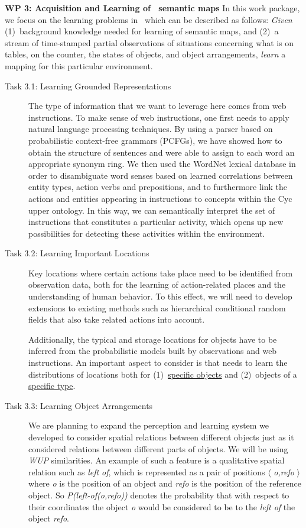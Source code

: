 \textbf{WP 3: Acquisition and Learning of \ksem\ semantic maps}
In this work package, we focus on the learning problems in 
\ksem\ which can be described as follows: \emph{Given} (1)~background
knowledge needed for learning of semantic maps,  and (2)~a stream
of time-stamped partial observations of situations concerning what is
on tables, on the counter, the states of objects, and object
arrangements, \emph{learn} a mapping for this particular environment.
\begin{description}
\item[Task 3.1: Learning Grounded Representations] The
  type of information that we want to leverage here comes from web instructions.
  To make sense of web instructions, one first needs to apply natural language
  processing techniques. By using a parser based on probabilistic
  context-free grammars (PCFGs),
  we have showed how to obtain the structure of sentences and were able to assign to each word an appropriate synonym ring.
  We then used the WordNet lexical database in order to disambiguate word senses based on learned
  correlations between entity types, action verbs and prepositions, and to furthermore
  link the actions and entities appearing in instructions to concepts within the Cyc
  upper ontology. In this way, we can semantically interpret the set of instructions that
  constitutes a particular activity, which opens up 
  new possibilities for detecting these activities within the environment.

\item[Task 3.2: Learning Important Locations] 
  Key locations where certain actions take place need to be identified from
  observation data, both for the learning of action-related places
  and the understanding of human behavior. To this effect, we will need to develop extensions
  to existing methods such as hierarchical conditional random fields
  that also take related actions into account.

  Additionally, the typical and storage locations for objects have to
  be inferred from the probabilistic models built by observations and
  web instructions.
  An important aspect to consider is that \ksem needs to learn the distributions
  of locations both for (1)~\underline{specific objects} and (2)~objects of a
  \underline{specific type}.

\item[Task 3.3: Learning Object Arrangements]
  We are planning to expand the perception and learning system we developed
  to consider spatial relations between different objects just as it considered relations between
  different parts of objects. We will be using \emph{WUP} similarities.
  An example of such a feature is a qualitative spatial relation
  such as \emph{left of}, which is represented as a 
  pair of positions $\langle$ \emph{o,refo} $\rangle$ where
  \emph{o} is the position of an object and
  \emph{refo} is the position of the reference object. So
  \emph{P(left-of(o,refo))} denotes the probability that with
  respect to their coordinates the object \emph{o} would be
  considered to be to the \emph{left of} the object \emph{refo}.


\end{description}
